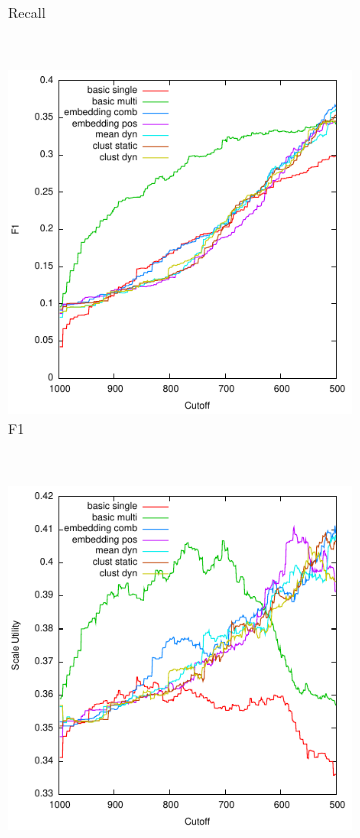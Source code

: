 \documentclass{article}
\begin{document}
{{\begin{figure}[tb]
\begin{subfigure}[b]{\officialRunWidth}
			\caption{Recall}
			\label{official:recall}
    \end{subfigure}
    ~
    \begin{subfigure}[b]{\officialRunWidth}
            \includegraphics[width=\textwidth]{fig/official/official-f1}
			\caption{F1}
			\label{official:f1}
    \end{subfigure}
    ~
    \begin{subfigure}[b]{\officialRunWidth}
            \includegraphics[width=\textwidth]{fig/official/official-su}

\end{subfigure}
\end{figure}}}
\end{document}
